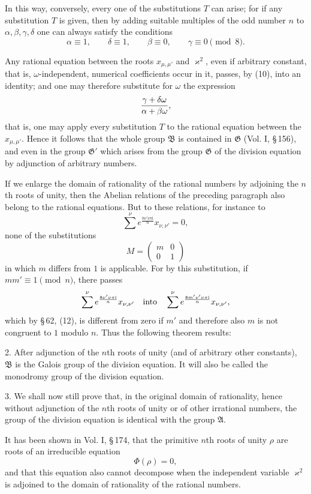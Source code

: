 \documentclass[11pt]{article}
\providecommand{\ii}{\mathrm{i}}
\begin{document}
In this way, conversely, every one of the substitutions $T$ can arise; for if any
substitution $T$ is given, then by adding suitable multiples of the odd number $n$ to
$\alpha,\beta,\gamma,\delta$ one can always satisfy the conditions
\[
 \alpha\equiv1,
 \qquad \delta\equiv1,
 \qquad \beta\equiv0,
 \qquad \gamma\equiv0\pmod 8.
\]

Any rational equation between the roots $x_{\mu,\mu'}$ and $\varkappa^2$, even if arbitrary
constant, that is, $\omega$-independent, numerical coefficients occur in it, passes, by (10),
into an identity; and one may therefore substitute for $\omega$ the expression
\[
 {\gamma+\delta\omega\over\alpha+\beta\omega},
\]
that is, one may apply every substitution $T$ to the rational equation between the
$x_{\mu,\mu'}$. Hence it follows that the whole group $\mathfrak B$ is contained in
$\mathfrak G$ (Vol. I, \S\,156), and even in the group $\mathfrak G'$ which arises from the
group $\mathfrak G$ of the division equation by adjunction of arbitrary numbers.

If we enlarge the domain of rationality of the rational numbers by adjoining the $n$th roots
of unity, then the Abelian relations of the preceding paragraph also belong to the rational
equations. But to these relations, for instance to
\[
 \sum^\nu e^{\frac{8\nu'\nu\pi \ii}{n}}x_{\nu,\nu'}=0,
\]
none of the substitutions
\[
 M=\begin{pmatrix}m&0\\0&1\end{pmatrix}
\]
in which $m$ differs from $1$ is applicable. For by this substitution, if
$mm'\equiv1\pmod n$, there passes
\[
 \sum^\nu e^{\frac{8\nu'\nu\pi \ii}{n}}x_{\nu,\nu'}
 \quad\hbox{into}\quad
 \sum^\nu e^{\frac{8m'\nu'\nu\pi \ii}{n}}x_{\nu,\nu'},
\]
which by \S\,62, (12), is different from zero if $m'$ and therefore also $m$ is not
congruent to $1$ modulo $n$. Thus the following theorem results:

2. After adjunction of the $n$th roots of unity (and of arbitrary other constants),
$\mathfrak B$ is the Galois group of the division equation. It will also be called the
monodromy group of the division equation.

3. We shall now still prove that, in the original domain of rationality, hence without
adjunction of the $n$th roots of unity or of other irrational numbers, the group of the
division equation is identical with the group $\mathfrak A$.

It has been shown in Vol. I, \S\,174, that the primitive $n$th roots of unity $\rho$ are roots
of an irreducible equation
\begin{equation}
 \Phi(\rho)=0,
\tag{12}
\end{equation}
and that this equation also cannot decompose when the independent variable $\varkappa^2$
is adjoined to the domain of rationality of the rational numbers.
\end{document}
